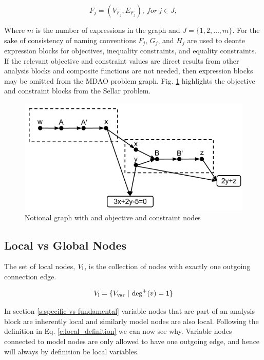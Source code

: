 \begin{equation}
  F_j=(V_{F_j},E_{F_j}),\ for\ j\in J, 
\end{equation}

Where $m$ is the number of expressions in the graph
and $J=\{1,2,\ldots,m\}$. For the sake of consistency of naming conventions
$F_j$, $G_j$, and $H_j$ are used to deonte expression blocks for objectives, inequality
constraints, and equality constraints. If the relevant 
objective and constraint values are direct results from other analysis blocks 
and composite functions are not needed, then expression blocks may be omitted 
from the MDAO problem graph. Fig. \ref{f:obj-cons} highlights the 
objective and constraint blocks from the Sellar problem. 

\begin{figure}[htb!]
  \begin{center}
    \includegraphics[width=.6\textwidth]{images/obj_const_graph}
  \end{center}
  \caption{Notional graph with and objective and constraint nodes \label{f:obj-cons}}
\end{figure}

\subsection{Local vs Global Nodes}

  The set of local nodes, $V_\textrm{l}$, is the collection of 
  nodes with exactly one outgoing connection edge. 

  \begin{equation}
    V_{\textrm{l}} = \{V_{\textrm{var}} \ | \  \textrm{deg}^+(v)=1\}
    \label{e:local_definition}
  \end{equation}

  In section \ref{s:specific vs fundamental} variable nodes that are part of 
  an analysis block are inherently local and similarly model nodes 
  are also local. Following the definition in Eq. \ref{e:local_definition}
  we can now see why. Variable nodes connected to model nodes are only allowed to 
  have one outgoing edge, and hence will always by definition be local variables. 

